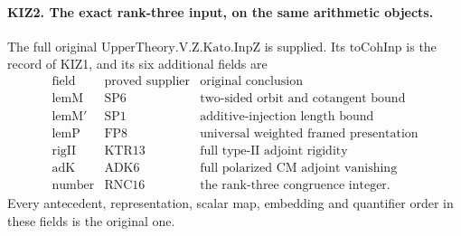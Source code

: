 
\paragraph{KIZ2. The exact rank-three input, on the same arithmetic objects.}
\label{claim:KIZ2}
The full original \(\mathrm{UpperTheory.V.Z.Kato.InpZ}\) is
supplied.  Its \(\mathrm{toCohInp}\) is the record of KIZ1,
and its six additional fields are
\[
\begin{array}{c|c|l}
\text{field}&\text{proved supplier}&\text{original conclusion}\\ \hline
\mathrm{lemM}&\mathrm{SP6}&\text{two-sided orbit and cotangent bound}\\
\mathrm{lemM'}&\mathrm{SP1}&\text{additive-injection length bound}\\
\mathrm{lemP}&\mathrm{FP8}&\text{universal weighted framed presentation}\\
\mathrm{rigII}&\mathrm{KTR13}&\text{full type-II adjoint rigidity}\\
\mathrm{adK}&\mathrm{ADK6}&\text{full polarized CM adjoint vanishing}\\
\mathrm{number}&\mathrm{RNC16}&\text{the rank-three congruence integer}.
\end{array}
\tag{KIZ.2}
\]
Every antecedent, representation, scalar map, embedding and
quantifier order in these fields is the original one.

